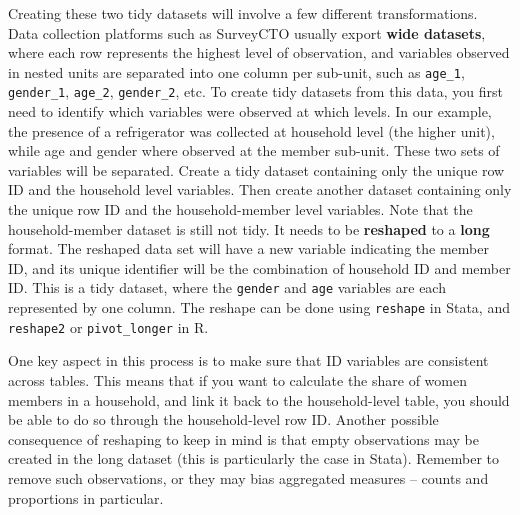 Creating these two tidy datasets will involve a few different transformations.
Data collection platforms such as SurveyCTO usually export \textbf{wide datasets},
where each row represents the highest level of observation,
and variables observed in nested units are separated into one column per sub-unit,
such as \texttt{age\_1}, \texttt{gender\_1}, \texttt{age\_2}, \texttt{gender\_2}, etc.
To create tidy datasets from this data,
you first need to identify which variables were observed at which levels.
In our example, the presence of a refrigerator was collected at household level (the higher unit),
while age and gender where observed at the member sub-unit.
These two sets of variables will be separated.
Create a tidy dataset containing only the unique row ID and the household level variables.
Then create another dataset containing only the unique row ID and the household-member level variables.
Note that the household-member dataset is still not tidy.
It needs to be \textbf{reshaped}
to a \textbf{long} format.
The reshaped data set will have a new variable indicating the member ID,
and its unique identifier will be the combination of household ID and member ID.
This is a tidy dataset, where
the \texttt{gender} and \texttt{age} variables are each represented by one column.
The reshape can be done using \texttt{reshape} in Stata, and \texttt{reshape2} or \texttt{pivot\_longer} in R.

One key aspect in this process is to make sure that ID variables are consistent across tables.
This means that if you want to calculate the share of women members in a household,
and link it back to the household-level table, 
you should be able to do so through the household-level row ID.
Another possible consequence of reshaping to keep in mind is that
empty observations may be created in the long dataset
(this is particularly the case in Stata).
Remember to remove such observations,
or they may bias aggregated measures --
counts and proportions in particular.

